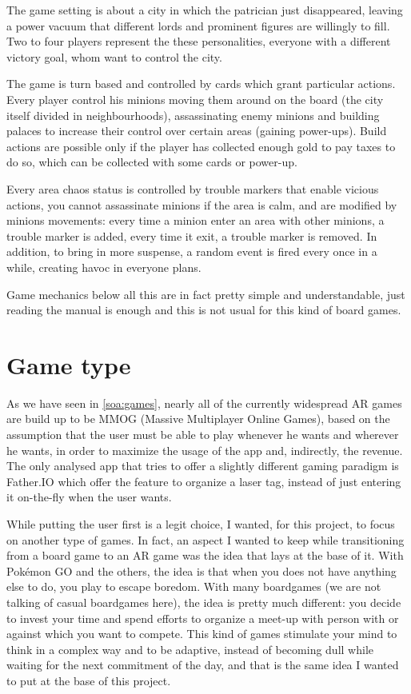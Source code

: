 		The game setting is about a city in which the patrician just disappeared, leaving a power vacuum that different lords and prominent figures are willingly to fill.
		Two to four players represent the these personalities, everyone with a different victory goal, whom want to control the city.
		
		The game is turn based and controlled by cards which grant particular actions.
		Every player control his minions moving them around on the board (the city itself divided in neighbourhoods), assassinating enemy minions and building palaces to increase their control over certain areas (gaining power-ups).
		Build actions are possible only if the player has collected enough gold to pay taxes to do so, which can be collected with some cards or power-up.
	
		Every area chaos status is controlled by trouble markers that enable vicious actions, you cannot assassinate minions if the area is calm, and are modified by minions movements: every time a minion enter an area with other minions, a trouble marker is added, every time it exit, a trouble marker is removed.
		In addition, to bring in more suspense, a random event is fired every once in a while, creating havoc in everyone plans.
		
		Game mechanics below all this are in fact pretty simple and understandable, just reading the manual is enough and this is not usual for this kind of board games.
	
	\section{Game type}
	
		As we have seen in \autoref{soa:games}, nearly all of the currently widespread AR games are build up to be MMOG (Massive Multiplayer Online Games), based on the assumption that the user must be able to play whenever he wants and wherever he wants, in order to maximize the usage of the app and, indirectly, the revenue.
		The only analysed app that tries to offer a slightly different gaming paradigm is Father.IO which offer the feature to organize a laser tag, instead of just entering it on-the-fly when the user wants.
		
		While putting the user first is a legit choice, I wanted, for this project, to focus on another type of games.
		In fact, an aspect I wanted to keep while transitioning from a board game to an AR game was the idea that lays at the base of it.
		With Pokémon GO and the others, the idea is that when you does not have anything else to do, you play to escape boredom.
		With many boardgames (we are not talking of casual boardgames here), the idea is pretty much different: you decide to invest your time and spend efforts to organize a meet-up with person with or against which you want to compete.
		This kind of games stimulate your mind to think in a complex way and to be adaptive, instead of becoming dull while waiting for the next commitment of the day, and that is the same idea I wanted to put at the base of this project.
		
